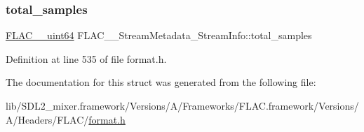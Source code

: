 \subsubsection{\texorpdfstring{total\_samples}{total\_samples}}
{\footnotesize\ttfamily \mbox{\hyperlink{ordinals_8h_aa78c8c70a3eb8a58af7436f278acde8e}{F\+L\+A\+C\+\_\+\+\_\+uint64}} F\+L\+A\+C\+\_\+\+\_\+\+Stream\+Metadata\+\_\+\+Stream\+Info\+::total\+\_\+samples}



Definition at line 535 of file format.\+h.



The documentation for this struct was generated from the following file\+:\begin{DoxyCompactItemize}
\item 
lib/\+S\+D\+L2\+\_\+mixer.\+framework/\+Versions/\+A/\+Frameworks/\+F\+L\+A\+C.\+framework/\+Versions/\+A/\+Headers/\+F\+L\+A\+C/\mbox{\hyperlink{format_8h}{format.\+h}}\end{DoxyCompactItemize}
